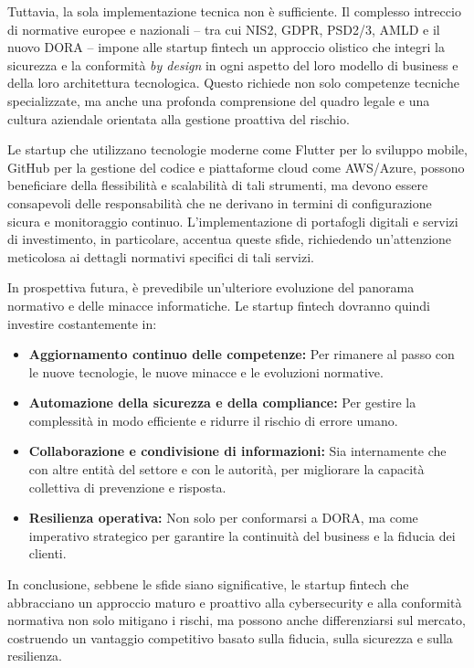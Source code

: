Tuttavia, la sola implementazione tecnica non è sufficiente. Il complesso intreccio di normative europee e nazionali – tra cui NIS2, GDPR, PSD2/3, AMLD e il nuovo DORA – impone alle startup fintech un approccio olistico che integri la sicurezza e la conformità \textit{by design} in ogni aspetto del loro modello di business e della loro architettura tecnologica. Questo richiede non solo competenze tecniche specializzate, ma anche una profonda comprensione del quadro legale e una cultura aziendale orientata alla gestione proattiva del rischio.

Le startup che utilizzano tecnologie moderne come Flutter per lo sviluppo mobile, GitHub per la gestione del codice e piattaforme cloud come AWS/Azure, possono beneficiare della flessibilità e scalabilità di tali strumenti, ma devono essere consapevoli delle responsabilità che ne derivano in termini di configurazione sicura e monitoraggio continuo. L'implementazione di portafogli digitali e servizi di investimento, in particolare, accentua queste sfide, richiedendo un'attenzione meticolosa ai dettagli normativi specifici di tali servizi.

In prospettiva futura, è prevedibile un'ulteriore evoluzione del panorama normativo e delle minacce informatiche. Le startup fintech dovranno quindi investire costantemente in:
\begin{itemize}
    \item \textbf{Aggiornamento continuo delle competenze:} Per rimanere al passo con le nuove tecnologie, le nuove minacce e le evoluzioni normative.
    \item \textbf{Automazione della sicurezza e della compliance:} Per gestire la complessità in modo efficiente e ridurre il rischio di errore umano.
    \item \textbf{Collaborazione e condivisione di informazioni:} Sia internamente che con altre entità del settore e con le autorità, per migliorare la capacità collettiva di prevenzione e risposta.
    \item \textbf{Resilienza operativa:} Non solo per conformarsi a DORA, ma come imperativo strategico per garantire la continuità del business e la fiducia dei clienti.
\end{itemize}
In conclusione, sebbene le sfide siano significative, le startup fintech che abbracciano un approccio maturo e proattivo alla cybersecurity e alla conformità normativa non solo mitigano i rischi, ma possono anche differenziarsi sul mercato, costruendo un vantaggio competitivo basato sulla fiducia, sulla sicurezza e sulla resilienza.